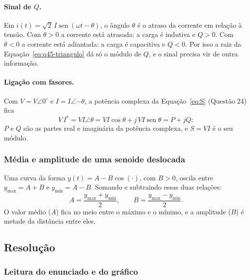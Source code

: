 \documentclass[a4paper,11pt]{article}
\providecommand{\sen}{\operatorname{sen}}   %
\numberwithin{equation}{section}
\numberwithin{figure}{section}
\numberwithin{table}{section}
\begin{document}
\paragraph{Sinal de $Q$.} Em $i(t) = \sqrt{2}\,I\sen(\omega t - \theta)$, o
ângulo $\theta$ é o atraso da corrente em relação à tensão. Com $\theta > 0$
a corrente está atrasada: a carga é indutiva e $Q > 0$. Com $\theta < 0$ a
corrente está adiantada: a carga é capacitiva e $Q < 0$. Por isso a raiz da
Equação~\eqref{eq:q45-triangulo} dá só o módulo de $Q$, e o sinal precisa
vir de outra informação.

\paragraph{Ligação com fasores.} Com $V = V\angle 0^\circ$ e $I =
I\angle{-\theta}$, a potência complexa da Equação~\eqref{eq:S} (Questão 24)
fica
\[
  V\,I^{*} = VI\angle\theta = VI\cos\theta + j\,VI\sen\theta = P + jQ :
\]
$P$ e $Q$ são as partes real e imaginária da potência complexa, e $S = VI$
é o seu módulo.

\subsubsection{Média e amplitude de uma senoide deslocada}

Uma curva da forma $y(t) = A - B\cos(\cdot)$, com $B > 0$, oscila entre
$y_{\max} = A + B$ e $y_{\min} = A - B$. Somando e subtraindo essas duas
relações:
\begin{equation}
  A = \frac{y_{\max} + y_{\min}}{2}, \qquad B = \frac{y_{\max} - y_{\min}}{2}.
  \label{eq:q45-media-amplitude}
\end{equation}
O valor médio ($A$) fica no meio entre o máximo e o mínimo, e a amplitude
($B$) é metade da distância entre eles.

\subsection{Resolução}

\subsubsection{Leitura do enunciado e do gráfico}
\end{document}
